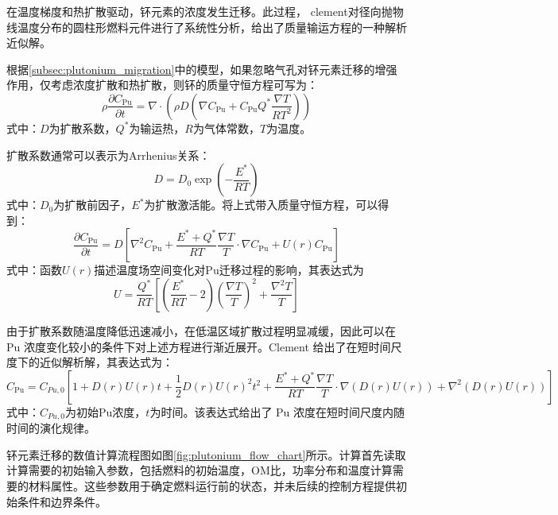 \label{sec:analytical_solution}
在温度梯度和热扩散驱动，钚元素的浓度发生迁移。此过程， clement\cite{c.f.AnalyticSolutionsMass1977}对径向抛物线温度分布的圆柱形燃料元件进行了系统性分析，给出了质量输运方程的一种解析近似解。

根据\ref{subsec:plutonium_migration}中的模型，如果忽略气孔对钚元素迁移的增强作用，仅考虑浓度扩散和热扩散，则钚的质量守恒方程可写为：
\begin{equation}
	\rho \frac{\partial C_{\mathrm{Pu}}}{\partial t} = \nabla \cdot \left(\rho D\left(\nabla C_{\mathrm{Pu}} + C_{\mathrm{Pu}} Q^{*}\frac{\nabla T}{RT^{2}}\right)\right)
\end{equation}
式中：$D$为扩散系数，$Q^{*}$为输运热，$R$为气体常数，$T$为温度。

扩散系数通常可以表示为Arrhenius关系：
\begin{equation}
	D = D_0 \exp\left(-\frac{E^{*}}{RT}\right)
\end{equation}
式中：$D_0$为扩散前因子，$E^{*}$为扩散激活能。将上式带入质量守恒方程，可以得到：
\begin{equation}
	\frac{\partial C_{\mathrm{Pu}}}{\partial t}
	=
	D
	\left[
	\nabla^{2}C_{\mathrm{Pu}}
	+
	\frac{E^{*}+Q^{*}}{RT}
	\frac{\nabla T}{T}\cdot\nabla C_{\mathrm{Pu}}
	+
	U(r)C_{\mathrm{Pu}}
	\right]
\end{equation}
式中：函数$U(r)$描述温度场空间变化对Pu迁移过程的影响，其表达式为
\begin{equation}
	U =
	\frac{Q^{*}}{RT}
	\left[
	\left(\frac{E^{*}}{RT}-2\right)\left(\frac{\nabla T}{T}\right)^2
	+
	\frac{\nabla^2T}{T}
	\right]
\end{equation}

由于扩散系数随温度降低迅速减小，在低温区域扩散过程明显减缓，因此可以在 Pu 浓度变化较小的条件下对上述方程进行渐近展开。Clement 给出了在短时间尺度下的近似解析解，其表达式为：
\begin{equation}
	C_{\mathrm{Pu}} =
	C_{Pu,0}
	\left[
	1
	+
	D(r)U(r)t
	+
	\frac{1}{2}D(r)U(r)^2 t^2
	+
	\frac{E^{*}+Q^{*}}{RT}
	\frac{\nabla T}{T}
	\cdot
	\nabla(D(r)U(r))
	+
	\nabla^{2}(D(r)U(r))
	\right]
\end{equation}
式中：$C_{Pu,0}$为初始Pu浓度，$t$为时间。该表达式给出了 Pu 浓度在短时间尺度内随时间的演化规律。

钚元素迁移的数值计算流程图如图\ref{fig:plutonium_flow_chart}所示。计算首先读取计算需要的初始输入参数，包括燃料的初始温度，O\/M比，功率分布和温度计算需要的材料属性。这些参数用于确定燃料运行前的状态，并未后续的控制方程提供初始条件和边界条件。

